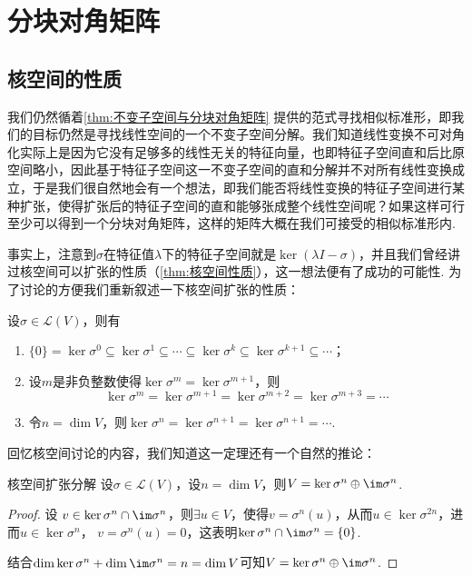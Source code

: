 \section{分块对角矩阵}

\subsection{核空间的性质}

我们仍然循着\autoref{thm:不变子空间与分块对角矩阵} 提供的范式寻找相似标准形，即我们的目标仍然是寻找线性空间的一个不变子空间分解。我们知道线性变换不可对角化实际上是因为它没有足够多的线性无关的特征向量，也即特征子空间直和后比原空间略小，因此基于特征子空间这一不变子空间的直和分解并不对所有线性变换成立，于是我们很自然地会有一个想法，即我们能否将线性变换的特征子空间进行某种扩张，使得扩张后的特征子空间的直和能够张成整个线性空间呢？如果这样可行至少可以得到一个分块对角矩阵，这样的矩阵大概在我们可接受的相似标准形内.

事实上，注意到$\sigma$在特征值$\lambda$下的特征子空间就是$\ker(\lambda I-\sigma)$，并且我们曾经讲过核空间可以扩张的性质（\autoref{thm:核空间性质}），这一想法便有了成功的可能性. 为了讨论的方便我们重新叙述一下核空间扩张的性质：
\begin{theorem}{}{}
    设$\sigma\in \mathcal{L}(V)$，则有
    \begin{enumerate}
        \item $\{0\}=\ker \sigma^0\subseteq\ker \sigma^1\subseteq\cdots\subseteq\ker \sigma^k\subseteq\ker \sigma^{k+1}\subseteq\cdots$；

        \item 设$m$是非负整数使得$\ker \sigma^m=\ker \sigma^{m+1}$，则
              \[\ker \sigma^m=\ker \sigma^{m+1}=\ker \sigma^{m+2}=\ker \sigma^{m+3}=\cdots\]

        \item 令$n=\dim V$，则$\ker \sigma^n=\ker \sigma^{n+1}=\ker \sigma^{n+1}=\cdots$.
    \end{enumerate}
\end{theorem}

回忆核空间讨论的内容，我们知道这一定理还有一个自然的推论：
\begin{theorem}{}{核空间扩张分解}
    设$\sigma\in\mathcal{L}(V)$，设$n=\dim V$，则$V=\ker \sigma^n\oplus \im \sigma^n$.
\end{theorem}
\begin{proof}
    设 $v \in \ker \sigma^n \cap \im \sigma^n$，则$\exists u \in V$，使得$v=\sigma^n(u)$，从而$u \in \ker \sigma^{2n}$，进而$u \in \ker \sigma^{n}$， $v=\sigma^n(u)=0$，这表明$\ker \sigma^n \cap \im \sigma^n=\{0\}$.

    结合$\dim \ker\sigma^n+\dim \im\sigma^n=n=\dim V$可知$V=\ker\sigma^n\oplus\im\sigma^n$.
\end{proof}

